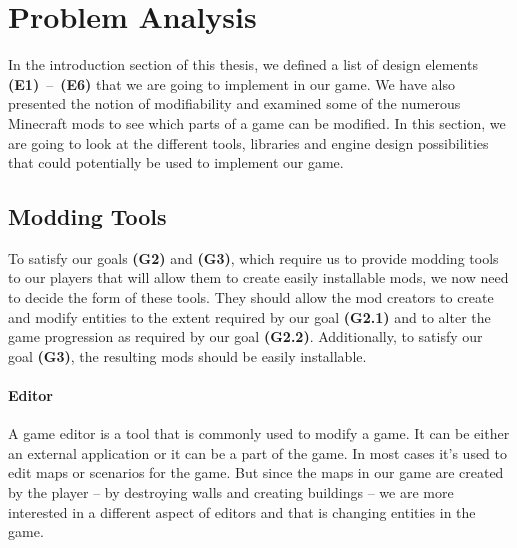 \chapter{Problem Analysis}

In the introduction section of this thesis, we defined a list of design elements \textbf{(E1)}~--~\textbf{(E6)} that we are going to
implement in our game. We have also presented the notion of modifiability and examined some of
the numerous Minecraft mods to see which parts of a game can be modified. In this section, we are
going to look at the different tools, libraries and engine design possibilities that could potentially
be used to implement our game.

\section{Modding Tools}

To satisfy our goals \textbf{(G2)} and \textbf{(G3)}, which require us to provide modding tools to our players that will allow
them to create easily installable mods, we now need to decide the form of these tools. They should allow the mod creators
to create and modify entities to the extent required by our goal \textbf{(G2.1)} and to alter the game progression as required
by our goal \textbf{(G2.2)}. Additionally, to satisfy our goal \textbf{(G3)}, the resulting mods should be easily installable.

\subsubsection{Editor}

A game editor is a tool that is commonly used to modify a game. It can be either an external application
or it can be a part of the game. In most cases it's used to edit maps or scenarios for the game.
But since the maps in our game are created by the player -- by destroying walls and creating buildings -- we are more interested in a
different aspect of editors and that is changing entities in the game.

